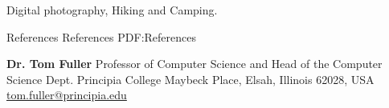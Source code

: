 \documentclass[a4paper,MMMyyyy,nonstopmode]{simpleresumecv}
\begin{document}
\begin{Body}
\Entry
Digital photography,
Hiking and Camping.


\Section
{References}
{References}
{PDF:References}

\BulletItem
\textbf{Dr. Tom Fuller}
\newline
Professor of Computer Science and Head of the Computer Science Dept.
\newline
Principia College
 Maybeck Place, Elsah, Illinois 62028, USA
\newline
\href{mailto:tom.fuller@principia.edu}
{tom.fuller@principia.edu}

\end{Body}
\end{document}
